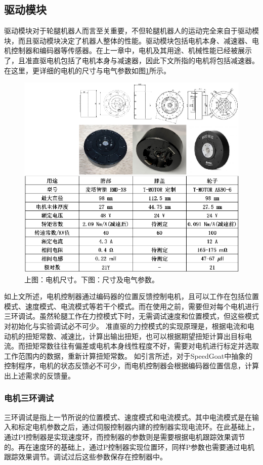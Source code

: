 \subsection{驱动模块}

驱动模块对于轮腿机器人而言至关重要，不但轮腿机器人的运动完全来自于驱动模块，而且驱动模块决定了机器人整体的性能。驱动模块包括电机本身、减速器、电机控制器和编码器等传感器。在上一章中，电机及其用途、机械性能已经被展示了，且准直驱电机包括了电机本身与减速器，因此下文所指的电机将包括减速器。在这里，更详细的电机的尺寸与电气参数如图\ref{fig:sec3-motors}所示。

\begin{figure}
  \centering
  \includegraphics[width=0.85\linewidth]{figures/Sec3/motors.png}
  \caption{
  上图：电机尺寸。下图：尺寸及电气参数。
  }
  \label{fig:sec3-motors}
   \vspace{6pt}
\end{figure}

如上文所述，电机控制器通过编码器的位置反馈控制电机，且可以工作在包括位置模式、速度模式、电流模式等若干个模式。而在使用之前，需要但对每个电机进行三环调试。虽然轮腿工作在力控模式下时，无需调试速度和位置模式，但这些模式对初始化与实验调试必不可少。
准直驱的力控模式的实现原理是，根据电流和电动机的扭矩常数、减速比，计算出输出扭矩，也可以根据期望扭矩计算出目标电流。而扭矩常数往往有偏差或电机本身线性程度不好，需要对电机进行标定并选取工作范围内的数据，重新计算扭矩常数。
如引言所述，对于SpeedGoat中抽象的控制程序，电机的状态反馈必不可少，而电机控制器会根据编码器位置信息，计算出上述需求的反馈量。

\subsubsection{电机三环调试}
三环调试是指上一节所说的位置模式、速度模式和电流模式。其中电流模式是在输入和标定电机参数之后，通过伺服控制器内建的控制器实现电流环。在此基础上，通过PI控制器是实现速度环，而控制器的参数则是需要根据电机跟踪效果调节的。再在速度环的基础上，通过P控制器实现位置环，同样P参数也需要通过电机跟踪效果调节。调试过后这些参数保存在控制器中。

